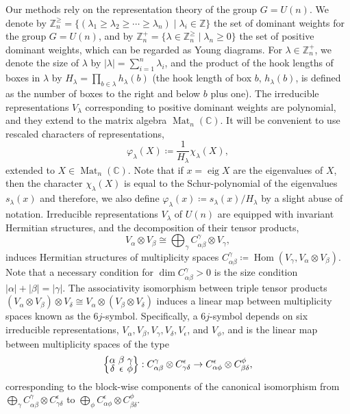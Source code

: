 \documentclass[pdflatex, sn-mathphys-num]{sn-jnl} %
\theoremstyle{plain}
\theoremstyle{definition}
\DeclareMathOperator{\Mat}{Mat}
\DeclareMathOperator{\Hom}{Hom}
\DeclareMathOperator{\eig}{eig}
\newcommand{\undomweights}[1]{\mathbb Z^{\geq}_{#1}}
\newcommand{\undomweightsp}[1]{\mathbb Z^{+}_{#1}}
\newcommand{\ot}{\otimes} %
\newcommand{\vp}{\varphi} %
\newcommand{\ex}{x}
\newcommand{\ya}{\alpha}
\newcommand{\yb}{\beta}
\newcommand{\yc}{\gamma}
\newcommand{\yd}{\delta}
\newcommand{\ye}{\epsilon}
\newcommand{\yf}{\phi}
\newcommand{\yx}{\lambda}
\newcommand{\sya}{|\ya|}
\newcommand{\syb}{|\yb|}
\newcommand{\syc}{|\yc|}
\newcommand{\syx}{|\yx|}
\newcommand{\tightcurlysixj}[1]{
\begingroup
\arraycolsep=1.5pt
\renewcommand{\arraystretch}{0.3}
\left\{\!\begin{array}{ccc}
    #1
\end{array}\!\right\}
\endgroup
}
\newcommand{\abcdefsymbol}{\tightcurlysixj{\alpha & \beta & \gamma \\ \delta & \epsilon & \phi}}
\begin{document}
Our methods rely on the representation theory of the group $G = U(n)$.
We denote by $\undomweights{n} = \{ (\yx_1 \geq \yx_2 \geq \cdots \geq \yx_n) \mid \yx_i \in \mathbb{Z} \}$ the set of dominant weights for the group $G=U(n)$, and
by $\undomweightsp{n} = \{ \yx \in \undomweights{n} \mid \yx_n \geq 0\}$ the set of positive dominant weights, which can be regarded as Young diagrams.
For $\yx \in \undomweightsp{n}$, we denote the size of $\yx$ by $\syx = \sum_{i=1}^n \yx_i$, and the product of the hook lengths of boxes in $\yx$ by $H_{\yx} = \prod_{b\in \yx} h_{\yx}(b)$ (the hook length of box $b$, $h_{\yx}(b)$, is defined as the number of boxes to the right and below $b$ plus one).
The irreducible representations $V_{\yx}$ corresponding to positive dominant weights are polynomial, and they extend to the matrix algebra $\Mat_n(\mathbb{C})$.
It will be convenient to use rescaled characters of representations,
\begin{equation}
    \vp_\yx(X) \coloneq \frac{1}{H_\yx} \chi_\yx(X),
\end{equation}
extended to $X \in \Mat_n(\mathbb{C})$.
Note that if $\ex = \eig X$ are the eigenvalues of $X$, then the character $\chi_\yx(X)$ is equal to the Schur-polynomial of the eigenvalues $s_{\yx}(\ex)$ and therefore, we also define $\vp_{\yx}(\ex) \coloneqq s_{\yx}(\ex)/H_\yx$ by a slight abuse of notation.
Irreducible representations $V_\yx$ of $U(n)$ are equipped with invariant Hermitian structures, and the decomposition of their tensor products,
\begin{equation}
    V_\ya \otimes V_\yb \cong \bigoplus_\yc C_{\ya \yb}^\yc \otimes V_\yc,
\end{equation}
induces Hermitian structures of multiplicity spaces $C_{\ya \yb}^\yc \coloneqq \Hom(V_{\yc}, V_{\ya}\ot V_{\yb})$.
Note that a necessary condition for $\dim C_{\ya \yb}^\yc > 0$ is the size condition $\sya + \syb = \syc$.
The associativity isomorphism between triple tensor products $(V_\ya \ot V_\yb) \ot V_\yd \cong V_\ya \ot (V_\yb \ot V_\yd)$ induces a linear map between multiplicity spaces known as the $6j$-symbol.
Specifically, a $6j$-symbol depends on six irreducible representations, $V_{\ya}, V_{\yb}, V_{\yc}, V_{\yd}, V_{\ye}$, and $V_{\yf}$, and is the linear map between multiplicity spaces of the type
\begin{equation*}
    \abcdefsymbol :
    C^{\yc}_{\ya\yb} \ot C^{\ye}_{\yc\yd} \to C^{\ye}_{\ya\yf} \ot C^{\yf}_{\yb\yd},
\end{equation*}
corresponding to the block-wise components of the canonical isomorphism from $\bigoplus_{\yc} C^{\yc}_{\ya\yb} \ot C^{\ye}_{\yc\yd}$ to $\bigoplus_{\yf} C^{\ye}_{\ya\yf} \ot C^{\yf}_{\yb\yd}$.
\end{document}
